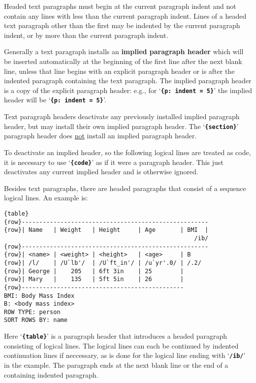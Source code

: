 \documentclass[12pt]{article}
\newcommand{\TT}[1]{{\tt \bfseries #1}}
\newcommand{\key}[1]{{\rm \bfseries #1}}
\newenvironment{indpar}[1][0.3in]%
	{\begin{list}{}%
		     {\setlength{\itemsep}{0in}%
		      \setlength{\topsep}{0in}%
		      \setlength{\parsep}{1ex}%
		      \setlength{\labelwidth}{#1}%
		      \setlength{\leftmargin}{#1}%
		      \addtolength{\leftmargin}{\labelsep}}%
	 \item}%
	{\end{list}}
\begin{document}
Headed text paragraphs must begin at the current paragraph indent
and not contain any lines with less than the current paragraph indent.
Lines of a headed text paragraph other than the first may be indented
by the current paragraph indent, or by more than the current paragraph
indent.

Generally a text paragraph installs an \key{implied paragraph header}
which will be inserted automatically at the beginning of the first
line after the next blank line, unless that line begins with an
explicit paragraph header or is after the indented paragraph containing
the text paragraph.  The implied
paragraph header is a copy of the explicit paragraph header:
e.g., for `\TT{\{p:~indent = 5\}}' the implied header will
be `\TT{\{p:~indent = 5\}}'.

Text paragraph headers deactivate any previously installed implied
paragraph header, but may install their own implied paragraph header.
The `\TT{\{section\}}' paragraph
header does \underline{not} install an implied paragraph header.

To deactivate an implied header, so the following logical lines
are treated as code, it is necessary
to use `\TT{\{code\}}' as if it were a paragraph header.
This just deactivates any current implied header
and is otherwise ignored.

Besides text paragraphs, there are headed paragraphs that consist
of a sequence logical lines.  An example is:
\begin{indpar}\begin{verbatim}
{table}
{row}-----------------------------------------------------
{row}| Name   | Weight   | Height     | Age       | BMI  |
                                                      /ib/
{row}-----------------------------------------------------
{row}| <name> | <weight> | <height>   | <age>     | B
{row}| /l/    | /U`lb'/  | /U`ft_in'/ | /u`yr'.0/ | /.2/
{row}| George |    205   | 6ft 3in    | 25        |
{row}| Mary   |    135   | 5ft 5in    | 26        |
{row}----------------------------------------------
BMI: Body Mass Index
B: <body mass index>
ROW TYPE: person
SORT ROWS BY: name
\end{verbatim}\end{indpar}

Here `\TT{\{table\}}'\label{TABLE-PARAGRAPH}
is a paragraph header that introduces
a headed paragraph consisting of logical lines.  The logical
lines can each be continued by indented continuation lines
if neccessary, as is done for the logical line ending with
`\TT{/ib/}' in the example.  The paragraph ends at the next blank line
or the end of a containing indented paragraph.
\end{document}

